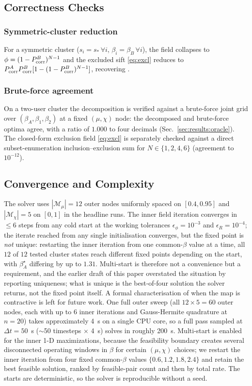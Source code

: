 \subsection{Correctness Checks}

\subsubsection{Symmetric-cluster reduction}
For a symmetric cluster ($s_i = s_*\,\forall i$, $\beta_i = \beta_B\,\forall i$), the field collapses to $\phi = (1-P_{\mathrm{corr}}^B)^{N-1}$ and the excluded sift \eqref{eq:excl} reduces to $P_{\mathrm{corr}}^A P_{\mathrm{corr}}^B[1 - (1-P_{\mathrm{corr}}^B)^{N-1}]$, recovering \cite[Eq.~24]{vu2023photonics}.

\subsubsection{Brute-force agreement}
On a two-user cluster the decomposition is verified against a brute-force joint grid over $(\beta_A, \beta_1, \beta_2)$ at a fixed $(\mu,\chi)$ node: the decomposed and brute-force optima agree, with a ratio of $1.000$ to four decimals (Sec.~\ref{sec:results:oracle}). The closed-form exclusion field \eqref{eq:excl} is separately checked against a direct subset-enumeration inclusion--exclusion sum for $N\in\{1,2,4,6\}$ (agreement to $10^{-12}$).

\subsection{Convergence and Complexity}

The solver uses $|\mathcal{M}_\mu| = 12$ outer nodes uniformly spaced on $[0.4, 0.95]$ and $|\mathcal{M}_\chi| = 5$ on $[0,1]$ in the headline runs. The inner field iteration converges in $\le 6$ steps from any cold start at the working tolerances $\epsilon_\phi = 10^{-3}$ and $\epsilon_R = 10^{-4}$; the iterate reached from any single initialisation converges, but the fixed point is \emph{not} unique: restarting the inner iteration from one common-$\beta$ value at a time, all $12$ of $12$ tested cluster states reach different fixed points depending on the start, with $\beta_A^\star$ differing by up to $1.31$. Multi-start is therefore not a convenience but a requirement, and the earlier draft of this paper overstated the situation by reporting uniqueness; what is unique is the best-of-four solution the solver returns, not the fixed point itself. A formal characterisation of when the map is contractive is left for future work. One full outer sweep (all $12\times5 = 60$ outer nodes, each with up to 6 inner iterations and Gauss-Hermite quadrature at $n{=}20$) takes approximately 4~s on a single CPU core, so a full pass sampled at $\Delta t = 50$~s ($\sim$50 timesteps $\times$ 4~s) solves in roughly 200~s. Multi-start is enabled for the inner 1-D maximizations, because the feasibility boundary creates several disconnected operating windows in $\beta$ for certain $(\mu, \chi)$ choices; we restart the inner iteration from four fixed common-$\beta$ values $\{0.6, 1.2, 1.8, 2.4\}$ and retain the best feasible solution, ranked by feasible-pair count and then by total rate. The starts are deterministic, so the solver is reproducible without a seed.

